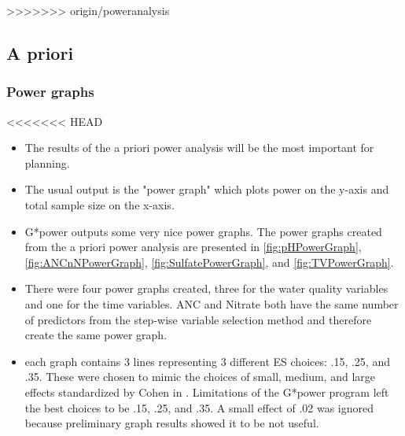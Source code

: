 >>>>>>> origin/poweranalysis
\subsection{A priori}

\subsubsection{Power graphs}
<<<<<<< HEAD
\begin{itemize}
	\item The results of the a priori power analysis will be the most important for planning.
	\item The usual output is the "power graph" which plots power on the y-axis and total sample size on the x-axis.
	\item G*power outputs some very nice power graphs. The power graphs created from the a priori power analysis are presented in \autoref{fig:pHPowerGraph}, \autoref{fig:ANCnNPowerGraph}, \autoref{fig:SulfatePowerGraph}, and \autoref{fig:TVPowerGraph}.
	\item There were four power graphs created, three for the water quality variables and one for the time variables.  ANC and Nitrate both have the same number of predictors from the step-wise variable selection method and therefore create the same power graph. 
	\item each graph contains 3 lines representing 3 different ES choices: .15, .25, and .35.  These were chosen to mimic the choices of small, medium, and large effects standardized by Cohen in \citep{cohen1992power}.  Limitations of the G*power program left the best choices to be .15, .25, and .35.   A small effect of .02 was ignored because preliminary graph results showed it to be  not useful.	
\end{itemize}
